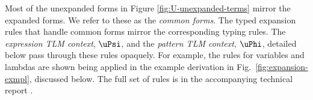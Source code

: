 \documentclass[acmsmall]{acmart}
\begin{document}



Most of the unexpanded forms in Figure \ref{fig:U-unexpanded-terms}  mirror the expanded forms. We refer to these as the \emph{common forms}. %
The typed expansion rules that handle common forms mirror the corresponding typing rules. The \emph{expression TLM context}, $\uPsi$, and the \emph{pattern TLM context}, $\uPhi$, detailed below pass through these rules opaquely. For example, the rules for variables and lambdas are shown being applied in the example derivation in Fig.~\ref{fig:expansion-exmpl}, discussed below. The full set of rules is in the accompanying technical report \cite{icfp18tr}.

\end{document}
